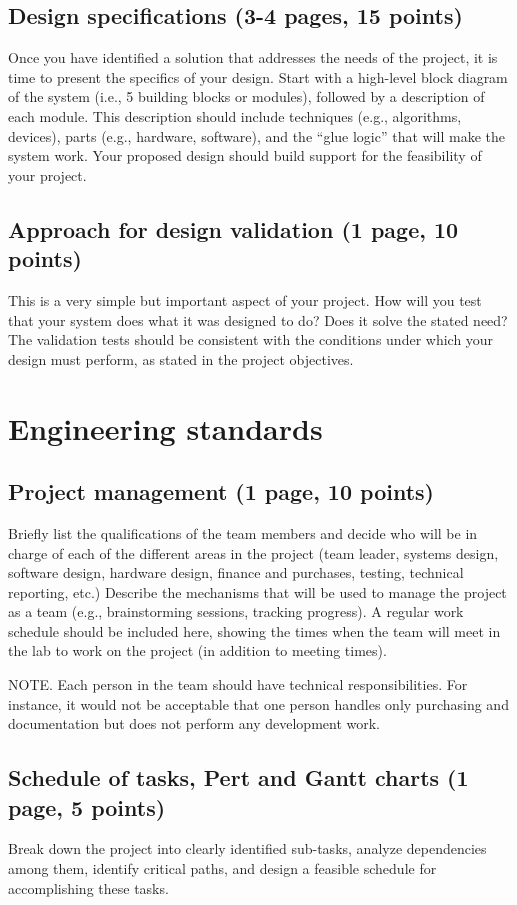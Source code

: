 \documentclass[letterpaper,12pt]{article}
\begin{document}
\subsection{Design specifications (3-4 pages, 15 points)}
Once you have identified a solution that addresses the needs of the
project, it is time to present the specifics of your design. Start with
a high-level block diagram of the system (i.e., 5 building blocks or
modules), followed by a description of each module. This description
should include techniques (e.g., algorithms, devices), parts (e.g.,
hardware, software), and the “glue logic” that will make the system
work.  Your proposed design should build support for the feasibility of
your project.

\subsection{Approach for design validation (1 page, 10 points)}
This is a very simple but important aspect of your project. How will you
test that your system does what it was designed to do? Does it solve the
stated need? The validation tests should be consistent with the conditions
under which your design must perform, as stated in the project objectives.


\section{Engineering standards}
\subsection{Project management (1 page, 10 points)}
Briefly list the qualifications of the team members and decide who will
be in charge of each of the different areas in the project (team leader,
systems design, software design, hardware design, finance and purchases,
testing, technical reporting, etc.) Describe the mechanisms that will
be used to manage the project as a team (e.g., brainstorming sessions,
tracking progress). A regular work schedule should be included here,
showing the times when the team will meet in the lab to work on the
project (in addition to meeting times).  

NOTE. Each person in the team
should have technical responsibilities. For instance, it would not be
acceptable that one person handles only purchasing and documentation
but does not perform any development work.

\subsection{Schedule of tasks, Pert and Gantt charts (1 page, 5 points)}
Break down the project into clearly identified sub-tasks, analyze
dependencies among them, identify critical paths, and design a feasible
schedule for accomplishing these tasks.
\end{document}
